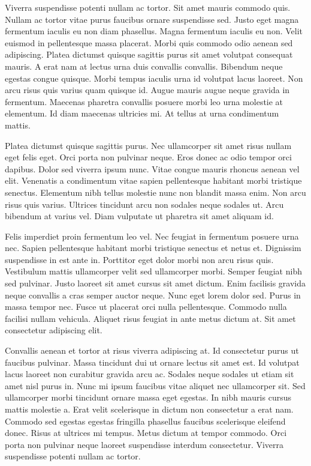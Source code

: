 \documentclass[11pt,a4paper]{article}
\begin{document}
Viverra suspendisse potenti nullam ac tortor. Sit amet mauris commodo quis. Nullam ac tortor vitae purus faucibus ornare suspendisse sed. Justo eget magna fermentum iaculis eu non diam phasellus. Magna fermentum iaculis eu non. Velit euismod in pellentesque massa placerat. Morbi quis commodo odio aenean sed adipiscing. Platea dictumst quisque sagittis purus sit amet volutpat consequat mauris. A erat nam at lectus urna duis convallis convallis. Bibendum neque egestas congue quisque. Morbi tempus iaculis urna id volutpat lacus laoreet. Non arcu risus quis varius quam quisque id. Augue mauris augue neque gravida in fermentum. Maecenas pharetra convallis posuere morbi leo urna molestie at elementum. Id diam maecenas ultricies mi. At tellus at urna condimentum mattis.

Platea dictumst quisque sagittis purus. Nec ullamcorper sit amet risus nullam eget felis eget. Orci porta non pulvinar neque. Eros donec ac odio tempor orci dapibus. Dolor sed viverra ipsum nunc. Vitae congue mauris rhoncus aenean vel elit. Venenatis a condimentum vitae sapien pellentesque habitant morbi tristique senectus. Elementum nibh tellus molestie nunc non blandit massa enim. Non arcu risus quis varius. Ultrices tincidunt arcu non sodales neque sodales ut. Arcu bibendum at varius vel. Diam vulputate ut pharetra sit amet aliquam id.

Felis imperdiet proin fermentum leo vel. Nec feugiat in fermentum posuere urna nec. Sapien pellentesque habitant morbi tristique senectus et netus et. Dignissim suspendisse in est ante in. Porttitor eget dolor morbi non arcu risus quis. Vestibulum mattis ullamcorper velit sed ullamcorper morbi. Semper feugiat nibh sed pulvinar. Justo laoreet sit amet cursus sit amet dictum. Enim facilisis gravida neque convallis a cras semper auctor neque. Nunc eget lorem dolor sed. Purus in massa tempor nec. Fusce ut placerat orci nulla pellentesque. Commodo nulla facilisi nullam vehicula. Aliquet risus feugiat in ante metus dictum at. Sit amet consectetur adipiscing elit.

Convallis aenean et tortor at risus viverra adipiscing at. Id consectetur purus ut faucibus pulvinar. Massa tincidunt dui ut ornare lectus sit amet est. Id volutpat lacus laoreet non curabitur gravida arcu ac. Sodales neque sodales ut etiam sit amet nisl purus in. Nunc mi ipsum faucibus vitae aliquet nec ullamcorper sit. Sed ullamcorper morbi tincidunt ornare massa eget egestas. In nibh mauris cursus mattis molestie a. Erat velit scelerisque in dictum non consectetur a erat nam. Commodo sed egestas egestas fringilla phasellus faucibus scelerisque eleifend donec. Risus at ultrices mi tempus. Metus dictum at tempor commodo. Orci porta non pulvinar neque laoreet suspendisse interdum consectetur. Viverra suspendisse potenti nullam ac tortor.
\end{document}

